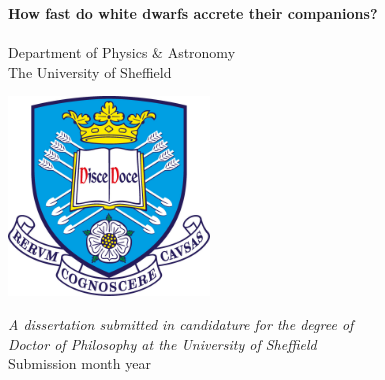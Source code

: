 \documentclass[a4paper,12pt,oneside,openright]{report}
\newcommand\blankpage{%
    \null
    \thispagestyle{empty}%
    \addtocounter{page}{-1}%
    \newpage}
\begin{document}
\begin{center}
\fontsize{24.88}{57.6}
\vspace*{-1cm}

\textbf{How fast do white dwarfs accrete their companions?}\\
\vspace*{2.5cm}
\LARGE
{}\\
\vspace{2cm}
\Large{Department of Physics \& Astronomy}\\
\Large{The University of Sheffield}\\
\vspace*{1cm}

\includegraphics[width=0.4\textwidth]{./figures/logo/tuoslogo2.jpg}\\

\vspace*{1cm}

\large
{\it A dissertation submitted in candidature for the degree of}\\
{\it Doctor of Philosophy at the University of Sheffield}\\
\vspace*{1.5cm}
{Submission month year}
\vfill
\end{center}
\afterpage{\blankpage}


\normalsize 




\end{document}
